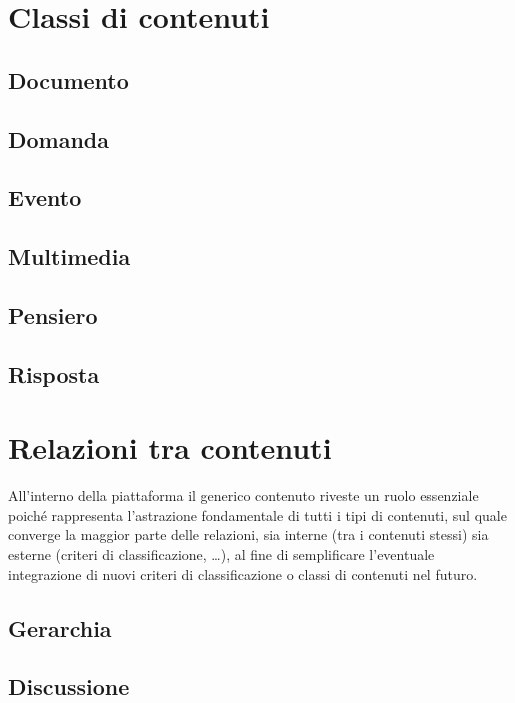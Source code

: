 \documentclass[10pt,a4paper,headinclude,footinclude,hidelinks]{scrreprt} %
\begin{document}
	\section{Classi di contenuti}
	\label{sec:stage:contenuti:classi}
	\subsection{Documento}
	\subsection{Domanda}
	\subsection{Evento}
	\subsection{Multimedia}
	\subsection{Pensiero}
	\subsection{Risposta}

	\section{Relazioni tra contenuti}
	\label{sec:stage:cls:contenuti:relazioni}
	All'interno della piattaforma il generico contenuto riveste un ruolo essenziale poiché rappresenta l'astrazione fondamentale di tutti i tipi di contenuti, sul quale converge la maggior parte delle relazioni, sia interne (tra i contenuti stessi) sia esterne (criteri di classificazione, \ldots), al fine di semplificare l'eventuale integrazione di nuovi criteri di classificazione o classi di contenuti nel futuro.
	\subsection{Gerarchia}
	\subsection{Discussione}
	
\end{document}
